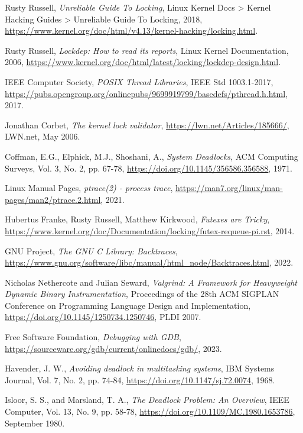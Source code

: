 
\begin{thebibliography}{12}
    Rusty Russell,
    \emph{Unreliable Guide To Locking},
    Linux Kernel Docs > Kernel Hacking Guides > Unreliable Guide To Locking, 2018,
    \url{https://www.kernel.org/doc/html/v4.13/kernel-hacking/locking.html}.

  Rusty Russell,
  \emph{Lockdep: How to read its reports},
  Linux Kernel Documentation, 2006,
  \url{https://www.kernel.org/doc/html/latest/locking/lockdep-design.html}.

  IEEE Computer Society,
  \emph{POSIX Thread Libraries},
  IEEE Std 1003.1-2017,
  \url{https://pubs.opengroup.org/onlinepubs/9699919799/basedefs/pthread.h.html}, 2017.

  Jonathan Corbet,
  \emph{The kernel lock validator},
  \url{https://lwn.net/Articles/185666/},
  LWN.net, May 2006.

  Coffman, E.G., Elphick, M.J., Shoshani, A.,
  \emph{System Deadlocks},
  ACM Computing Surveys, Vol. 3, No. 2, pp. 67-78,
  \url{https://doi.org/10.1145/356586.356588}, 1971.

  Linux Manual Pages,
  \emph{ptrace(2) - process trace},
  \url{https://man7.org/linux/man-pages/man2/ptrace.2.html}, 2021.

  Hubertus Franke, Rusty Russell, Matthew Kirkwood,
  \emph{Futexes are Tricky},
  \url{https://www.kernel.org/doc/Documentation/locking/futex-requeue-pi.rst}, 2014.

  GNU Project,
  \emph{The GNU C Library: Backtraces},
  \url{https://www.gnu.org/software/libc/manual/html_node/Backtraces.html}, 2022.

  Nicholas Nethercote and Julian Seward,
  \emph{Valgrind: A Framework for Heavyweight Dynamic Binary Instrumentation},
  Proceedings of the 28th ACM SIGPLAN Conference on Programming Language Design and Implementation,
  \url{https://doi.org/10.1145/1250734.1250746}, PLDI 2007.

  Free Software Foundation,
  \emph{Debugging with GDB},
  \url{https://sourceware.org/gdb/current/onlinedocs/gdb/}, 2023.

  Havender, J. W.,
  \emph{Avoiding deadlock in multitasking systems},
  IBM Systems Journal, Vol. 7, No. 2, pp. 74-84,
  \url{https://doi.org/10.1147/sj.72.0074}, 1968.

  Isloor, S. S., and Marsland, T. A.,
  \emph{The Deadlock Problem: An Overview},
  IEEE Computer, Vol. 13, No. 9, pp. 58-78,
  \url{https://doi.org/10.1109/MC.1980.1653786}, September 1980.


\end{thebibliography}
